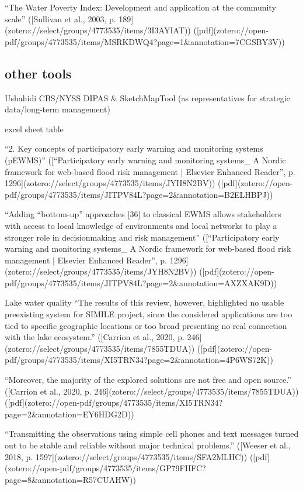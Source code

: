 {%
“The Water Poverty Index: Development and application at the community scale” ([Sullivan et al., 2003, p. 189](zotero://select/groups/4773535/items/3I3AYIAT)) ([pdf](zotero://open-pdf/groups/4773535/items/MSRKDWQ4?page=1&annotation=7CGSBY3V))

\subsection{other tools}

Ushahidi
CBS/NYSS
DIPAS \& SketchMapTool (as representatives for strategic data/long-term management)

excel sheet table

“2. Key concepts of participatory early warning and monitoring systems (pEWMS)” ([“Participatory early warning and monitoring systems_ A Nordic framework for web-based flood risk management | Elsevier Enhanced Reader”, p. 1296](zotero://select/groups/4773535/items/JYH8N2BV)) ([pdf](zotero://open-pdf/groups/4773535/items/JITPV84L?page=2&annotation=B2ELHBPJ))

“Adding “bottom-up” approaches [36] to classical EWMS allows stakeholders with access to local knowledge of environments and local networks to play a stronger role in decisionmaking and risk management” ([“Participatory early warning and monitoring systems_ A Nordic framework for web-based flood risk management | Elsevier Enhanced Reader”, p. 1296](zotero://select/groups/4773535/items/JYH8N2BV)) ([pdf](zotero://open-pdf/groups/4773535/items/JITPV84L?page=2&annotation=AXZXAK9D))

Lake water quality 
“The results of this review, however, highlighted no usable preexisting system for SIMILE project, since the considered applications are too tied to specific geographic locations or too broad presenting no real connection with the lake ecosystem.” ([Carrion et al., 2020, p. 246](zotero://select/groups/4773535/items/7855TDUA)) ([pdf](zotero://open-pdf/groups/4773535/items/XI5TRN34?page=2&annotation=4P6WS72K))

“Moreover, the majority of the explored solutions are not free and open source.” ([Carrion et al., 2020, p. 246](zotero://select/groups/4773535/items/7855TDUA)) ([pdf](zotero://open-pdf/groups/4773535/items/XI5TRN34?page=2&annotation=EY6HDG2D))

“Transmitting the observations using simple cell phones and text messages turned out to be stable and reliable without major technical problems.” ([Weeser et al., 2018, p. 1597](zotero://select/groups/4773535/items/SFA2MLHC)) ([pdf](zotero://open-pdf/groups/4773535/items/GP79FHFC?page=8&annotation=R57CUAHW))

}
